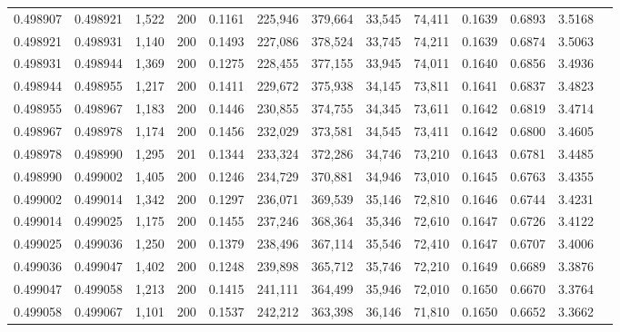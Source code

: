 \begin{tabular}{rrrrrrrrrrrrr}
0.498907 & 0.498921 & 1,522 & 200 &                                     0.1161 & 225,946 & 379,664 &  33,545 &  74,411 & 0.1639 & 0.6893 & 3.5168 \\
0.498921 & 0.498931 & 1,140 & 200 &                                     0.1493 & 227,086 & 378,524 &  33,745 &  74,211 & 0.1639 & 0.6874 & 3.5063 \\
0.498931 & 0.498944 & 1,369 & 200 &                                     0.1275 & 228,455 & 377,155 &  33,945 &  74,011 & 0.1640 & 0.6856 & 3.4936 \\
0.498944 & 0.498955 & 1,217 & 200 &                                     0.1411 & 229,672 & 375,938 &  34,145 &  73,811 & 0.1641 & 0.6837 & 3.4823 \\
0.498955 & 0.498967 & 1,183 & 200 &                                     0.1446 & 230,855 & 374,755 &  34,345 &  73,611 & 0.1642 & 0.6819 & 3.4714 \\
0.498967 & 0.498978 & 1,174 & 200 &                                     0.1456 & 232,029 & 373,581 &  34,545 &  73,411 & 0.1642 & 0.6800 & 3.4605 \\
0.498978 & 0.498990 & 1,295 & 201 &                                     0.1344 & 233,324 & 372,286 &  34,746 &  73,210 & 0.1643 & 0.6781 & 3.4485 \\
0.498990 & 0.499002 & 1,405 & 200 &                                     0.1246 & 234,729 & 370,881 &  34,946 &  73,010 & 0.1645 & 0.6763 & 3.4355 \\
0.499002 & 0.499014 & 1,342 & 200 &                                     0.1297 & 236,071 & 369,539 &  35,146 &  72,810 & 0.1646 & 0.6744 & 3.4231 \\
0.499014 & 0.499025 & 1,175 & 200 &                                     0.1455 & 237,246 & 368,364 &  35,346 &  72,610 & 0.1647 & 0.6726 & 3.4122 \\
0.499025 & 0.499036 & 1,250 & 200 &                                     0.1379 & 238,496 & 367,114 &  35,546 &  72,410 & 0.1647 & 0.6707 & 3.4006 \\
0.499036 & 0.499047 & 1,402 & 200 &                                     0.1248 & 239,898 & 365,712 &  35,746 &  72,210 & 0.1649 & 0.6689 & 3.3876 \\
0.499047 & 0.499058 & 1,213 & 200 &                                     0.1415 & 241,111 & 364,499 &  35,946 &  72,010 & 0.1650 & 0.6670 & 3.3764 \\
0.499058 & 0.499067 & 1,101 & 200 &                                     0.1537 & 242,212 & 363,398 &  36,146 &  71,810 & 0.1650 & 0.6652 & 3.3662 \\

\end{tabular}
